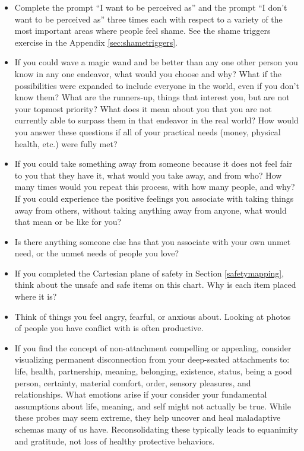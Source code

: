 \documentclass[12pt,letterpaper]{article}
\begin{document}
\begin{itemize}
    \item Complete the prompt “I want to be perceived as” and the prompt “I don't want to be perceived as” three times each with respect to a variety of the most important areas where people feel shame. See the shame triggers exercise in the Appendix \ref{sec:shametriggers}. 
    \item If you could wave a magic wand and be better than any one other person you know in any one endeavor, what would you choose and why? What if the possibilities were expanded to include everyone in the world, even if you don't know them? What are the runners-up, things that interest you, but are not your topmost priority? What does it mean about you that you are not currently able to surpass them in that endeavor in the real world? How would you answer these questions if all of your practical needs (money, physical health, etc.) were fully met?
    \item If you could take something away from someone because it does not feel fair to you that they have it, what would you take away, and from who? How many times would you repeat this process, with how many people, and why? If you could experience the positive feelings you associate with taking things away from others, without taking anything away from anyone, what would that mean or be like for you?
    \item Is there anything someone else has that you associate with your own unmet need, or the unmet needs of people you love?
    \item If you completed the Cartesian plane of safety in Section \ref{safetymapping}, think about the unsafe and safe items on this chart. Why is each item placed where it is?
    \item Think of things you feel angry, fearful, or anxious about. Looking at photos of people you have conflict with is often productive.
    \item If you find the concept of non-attachment compelling or appealing, consider visualizing permanent disconnection from your deep-seated attachments to: life, health, partnership, meaning, belonging, existence, status, being a good person, certainty, material comfort, order, sensory pleasures, and relationships. What emotions arise if your consider your fundamental assumptions about life, meaning, and self might not actually be true. While these probes may seem extreme, they help uncover and heal maladaptive schemas many of us have. Reconsolidating these typically leads to equanimity and gratitude, not loss of healthy protective behaviors.

\end{itemize}
\end{document}
